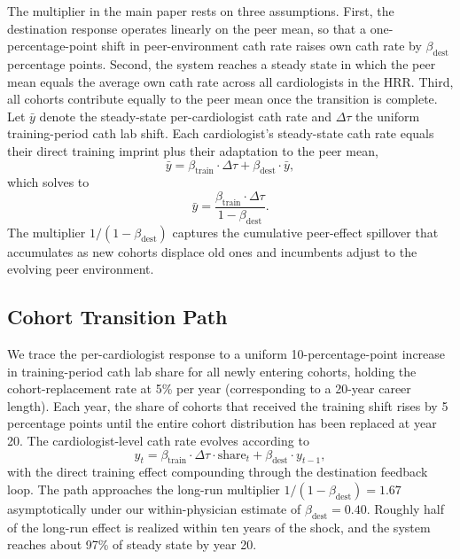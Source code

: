 \documentclass[12pt]{article}
\begin{document}
The multiplier in the main paper rests on three assumptions. First, the destination response operates linearly on the peer mean, so that a one-percentage-point shift in peer-environment cath rate raises own cath rate by $\beta_{\text{dest}}$ percentage points. Second, the system reaches a steady state in which the peer mean equals the average own cath rate across all cardiologists in the HRR. Third, all cohorts contribute equally to the peer mean once the transition is complete. Let $\bar{y}$ denote the steady-state per-cardiologist cath rate and $\Delta\tau$ the uniform training-period cath lab shift. Each cardiologist's steady-state cath rate equals their direct training imprint plus their adaptation to the peer mean,
\begin{equation*}
\bar{y} = \beta_{\text{train}} \cdot \Delta\tau + \beta_{\text{dest}} \cdot \bar{y},
\end{equation*}
which solves to
\begin{equation*}
\bar{y} = \frac{\beta_{\text{train}} \cdot \Delta\tau}{1 - \beta_{\text{dest}}}.
\end{equation*}
The multiplier $1/(1 - \beta_{\text{dest}})$ captures the cumulative peer-effect spillover that accumulates as new cohorts displace old ones and incumbents adjust to the evolving peer environment.

\subsection{Cohort Transition Path}

We trace the per-cardiologist response to a uniform 10-percentage-point increase in training-period cath lab share for all newly entering cohorts, holding the cohort-replacement rate at 5\% per year (corresponding to a 20-year career length). Each year, the share of cohorts that received the training shift rises by 5 percentage points until the entire cohort distribution has been replaced at year 20. The cardiologist-level cath rate evolves according to
\begin{equation*}
y_t = \beta_{\text{train}} \cdot \Delta\tau \cdot \text{share}_t + \beta_{\text{dest}} \cdot y_{t-1},
\end{equation*}
with the direct training effect compounding through the destination feedback loop. The path approaches the long-run multiplier $1/(1 - \beta_{\text{dest}}) = 1.67$ asymptotically under our within-physician estimate of $\beta_{\text{dest}} = 0.40$. Roughly half of the long-run effect is realized within ten years of the shock, and the system reaches about 97\% of steady state by year 20.
\end{document}
